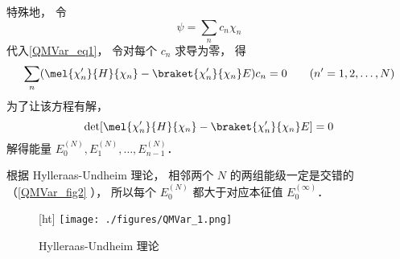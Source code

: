 特殊地， 令
\begin{equation}
\psi = \sum_n c_n \chi_n
\end{equation}
代入\autoref{QMVar_eq1}， 令对每个 $c_n$ 求导为零， 得
\begin{equation}
\sum_n (\mel{\chi_n'}{H}{\chi_n} - \braket{\chi_n'}{\chi_n}E)c_n = 0 \qquad (n' = 1,2,\dots,N)
\end{equation}
为了让该方程有解，
\begin{equation}
\det[\mel{\chi_n'}{H}{\chi_n} - \braket{\chi_n'}{\chi_n}E] = 0
\end{equation}
解得能量 $E_0^{(N)}, E_1^{(N)},\dots,E_{n-1}^{(N)}$．

根据 Hylleraas-Undheim 理论， 相邻两个 $N$ 的两组能级一定是交错的（\autoref{QMVar_fig2} ）， 所以每个 $E_0^{(N)}$ 都大于对应本征值 $E_0^{(\infty)}$．
\begin{figure}\label{QMVar_fig2}[ht]
\centering
\texttt{[image: ./figures/QMVar\_1.png]}
\caption{Hylleraas-Undheim 理论} \label{QMVar_fig1}
\end{figure}

